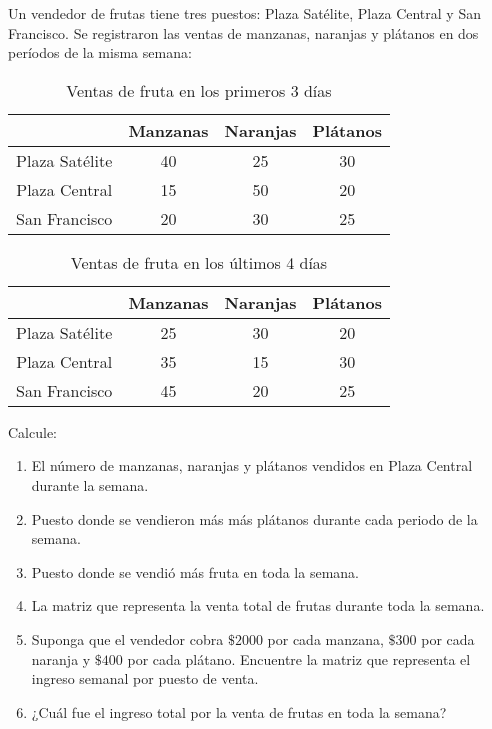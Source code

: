 \begin{prob} 
Un vendedor de frutas tiene tres puestos: Plaza Satélite, Plaza Central y San Francisco. Se registraron las ventas de manzanas, naranjas y plátanos en dos períodos de la misma semana:

\begin{table}[H]\centering
\begin{tabular}{|c||c|c|c|} \hline
& Manzanas & Naranjas & Plátanos \\ \hline
Plaza Satélite & 40 & 25 & 30 \\ 
Plaza Central & 15 & 50 & 20 \\ 
San Francisco & 20 & 30 & 25 \\ \hline
\end{tabular}
\caption{Ventas de fruta en los primeros 3 días}
\end{table}

\begin{table}[H]\centering
\begin{tabular}{|c||c|c|c|} \hline
& Manzanas & Naranjas & Plátanos \\ \hline
Plaza Satélite & 25 & 30 & 20 \\ 
Plaza Central & 35 & 15 & 30 \\ 
San Francisco & 45 & 20 & 25 \\ \hline
\end{tabular}
\caption{Ventas de fruta en los últimos 4 días}
\end{table}
Calcule:
\begin{enumerate}[$(a)$]
\item El número de manzanas, naranjas y plátanos vendidos en Plaza Central durante la semana.
\item Puesto donde se vendieron más más plátanos durante cada periodo de la semana.
\item Puesto donde se vendió más fruta en toda la semana.
\item La matriz que representa la venta total de frutas durante toda la semana.
\item Suponga que el vendedor cobra $\$2000$ por cada manzana, $\$300$ por cada naranja y $\$400$ por cada plátano. Encuentre la matriz que representa el ingreso semanal por puesto de venta.
\item ¿Cuál fue el ingreso total por la venta de frutas en toda la semana?
\end{enumerate}
\end{prob}

